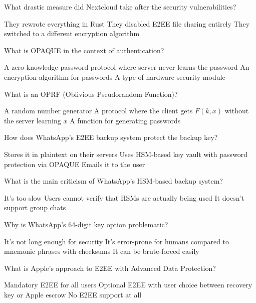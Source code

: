 \documentclass[10pt,a4paper,american]{exam}
\begin{document}
\begin{questions}
	\question What drastic measure did Nextcloud take after the security vulnerabilities?
	\begin{randomizechoices}
		\choice They rewrote everything in Rust
		\CorrectChoice They disabled E2EE file sharing entirely
		\choice They switched to a different encryption algorithm
	\end{randomizechoices}

	\question What is OPAQUE in the context of authentication?
	\begin{randomizechoices}
		\CorrectChoice A zero-knowledge password protocol where server never learns the password
		\choice An encryption algorithm for passwords
		\choice A type of hardware security module
	\end{randomizechoices}

	\question What is an OPRF (Oblivious Pseudorandom Function)?
	\begin{randomizechoices}
		\choice A random number generator
		\CorrectChoice A protocol where the client gets $F(k, x)$ without the server learning $x$
		\choice A function for generating passwords
	\end{randomizechoices}

	\question How does WhatsApp's E2EE backup system protect the backup key?
	\begin{randomizechoices}
		\choice Stores it in plaintext on their servers
		\CorrectChoice Uses HSM-based key vault with password protection via OPAQUE
		\choice Emails it to the user
	\end{randomizechoices}

	\question What is the main criticism of WhatsApp's HSM-based backup system?
	\begin{randomizechoices}
		\choice It's too slow
		\CorrectChoice Users cannot verify that HSMs are actually being used
		\choice It doesn't support group chats
	\end{randomizechoices}

	\question Why is WhatsApp's 64-digit key option problematic?
	\begin{randomizechoices}
		\choice It's not long enough for security
		\CorrectChoice It's error-prone for humans compared to mnemonic phrases with checksums
		\choice It can be brute-forced easily
	\end{randomizechoices}

	\question What is Apple's approach to E2EE with Advanced Data Protection?
	\begin{randomizechoices}
		\choice Mandatory E2EE for all users
		\CorrectChoice Optional E2EE with user choice between recovery key or Apple escrow
		\choice No E2EE support at all
	\end{randomizechoices}


\end{questions}
\end{document}
